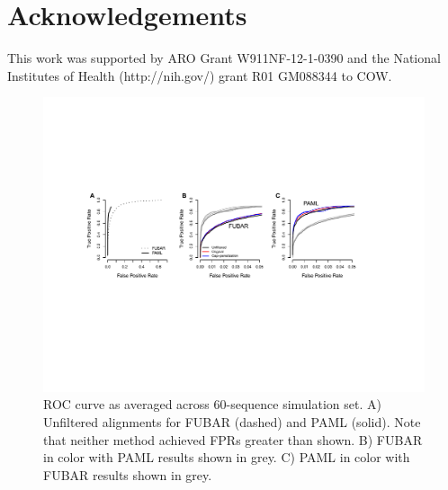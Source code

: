 \documentclass[11pt]{article}
\begin{document}
\section*{Acknowledgements}
This work was supported by ARO Grant W911NF-12-1-0390 and the National Institutes of Health (http://nih.gov/) grant R01 GM088344 to COW.


\begin{figure}[H]
\centerline{\includegraphics[width=6.75in]{Figures/roc.pdf}}
\caption{\label{roc} ROC curve as averaged across 60-sequence simulation set. A) Unfiltered alignments for FUBAR (dashed) and PAML (solid). Note that neither method achieved FPRs greater than shown. B) FUBAR in color with PAML results shown in grey. C) PAML in color with FUBAR results shown in grey.}
\end{figure}

\newpage
\end{document}
